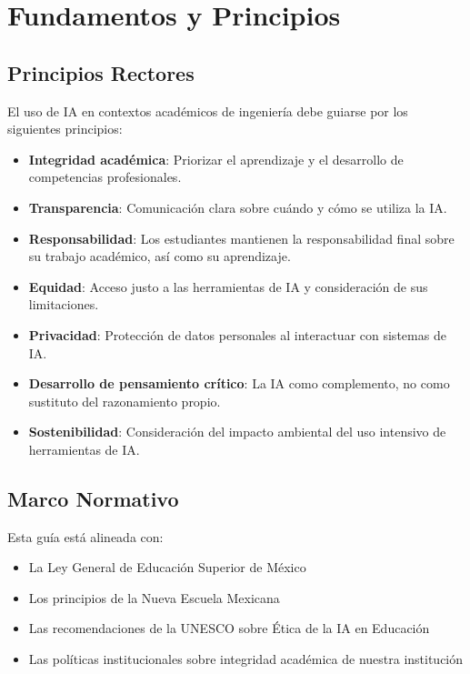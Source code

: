 \documentclass[11pt, letterpaper]{article}
\begin{document}
	\section{Fundamentos y Principios}
	
	\subsection{Principios Rectores}
	
	El uso de IA en contextos académicos de ingeniería debe guiarse por los siguientes principios:
	
	\begin{itemize}
		\item \textbf{Integridad académica}: Priorizar el aprendizaje y el desarrollo de competencias profesionales.
		\item \textbf{Transparencia}: Comunicación clara sobre cuándo y cómo se utiliza la IA.
		\item \textbf{Responsabilidad}: Los estudiantes mantienen la responsabilidad final sobre su trabajo académico, así como su aprendizaje.
		\item \textbf{Equidad}: Acceso justo a las herramientas de IA y consideración de sus limitaciones.
		\item \textbf{Privacidad}: Protección de datos personales al interactuar con sistemas de IA.
		\item \textbf{Desarrollo de pensamiento crítico}: La IA como complemento, no como sustituto del razonamiento propio.
		\item \textbf{Sostenibilidad}: Consideración del impacto ambiental del uso intensivo de herramientas de IA.
	\end{itemize}
	
	\subsection{Marco Normativo}
	
	Esta guía está alineada con:
	
	\begin{itemize}
		\item La Ley General de Educación Superior de México
		\item Los principios de la Nueva Escuela Mexicana
		\item Las recomendaciones de la UNESCO sobre Ética de la IA en Educación
		\item Las políticas institucionales sobre integridad académica de nuestra institución
	\end{itemize}
	
\end{document}
